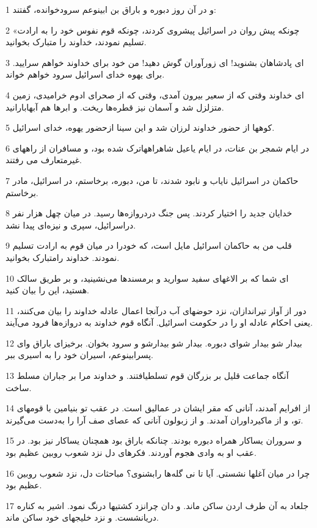 \par 1 و در آن روز دبوره و باراق بن ابینوعم سرودخوانده، گفتند:
\par 2 «چونکه پیش روان در اسرائیل پیشروی کردند، چونکه قوم نفوس خود را به ارادت تسلیم نمودند، خداوند را متبارک بخوانید.
\par 3 ‌ای پادشاهان بشنوید! ای زورآوران گوش دهید! من خود برای خداوند خواهم سرایید. برای یهوه خدای اسرائیل سرود خواهم خواند.
\par 4 ‌ای خداوند وقتی که از سعیر بیرون آمدی، وقتی که از صحرای ادوم خرامیدی، زمین متزلزل شد و آسمان نیز قطره‌ها ریخت. و ابرها هم آبهابارانید.
\par 5 کوهها از حضور خداوند لرزان شد و این سینا ازحضور یهوه، خدای اسرائیل.
\par 6 در ایام شمجر بن عنات، در ایام یاعیل شاهراههاترک شده بود، و مسافران از راههای غیرمتعارف می رفتند.
\par 7 حاکمان در اسرائیل نایاب و نابود شدند، تا من، دبوره، برخاستم، در اسرائیل، مادر برخاستم.
\par 8 خدایان جدید را اختیار کردند. پس جنگ دردروازه‌ها رسید. در میان چهل هزار نفر دراسرائیل، سپری و نیزه‌ای پیدا نشد.
\par 9 قلب من به حاکمان اسرائیل مایل است، که خودرا در میان قوم به ارادت تسلیم نمودند. خداوند رامتبارک بخوانید.
\par 10 ‌ای شما که بر الاغهای سفید سوارید و برمسندها می‌نشینید، و بر طریق سالک هستید، این را بیان کنید.
\par 11 دور از آواز تیراندازان، نزد حوضهای آب درآنجا اعمال عادله خداوند را بیان می‌کنند، یعنی احکام عادله او را در حکومت اسرائیل. آنگاه قوم خداوند به دروازه‌ها فرود می‌آیند.
\par 12 بیدار شو بیدار شو‌ای دبوره. بیدار شو بیدارشو و سرود بخوان. برخیز‌ای باراق و‌ای پسرابینوعم، اسیران خود را به اسیری ببر.
\par 13 آنگاه جماعت قلیل بر بزرگان قوم تسلطیافتند. و خداوند مرا بر جباران مسلط ساخت.
\par 14 از افرایم آمدند، آنانی که مقر ایشان در عمالیق است. در عقب تو بنیامین با قومهای تو، و از ماکیرداوران آمدند. و از زبولون آنانی که عصای صف آرا را به‌دست می‌گیرند.
\par 15 و سروران یساکار همراه دبوره بودند. چنانکه باراق بود همچنان یساکار نیز بود. در عقب او به وادی هجوم آوردند. فکرهای دل نزد شعوب روبین عظیم بود.
\par 16 چرا در میان آغلها نشستی. آیا تا نی گله‌ها رابشنوی؟ مباحثات دل، نزد شعوب روبین عظیم بود.
\par 17 جلعاد به آن طرف اردن ساکن ماند. و دان چرانزد کشتیها درنگ نمود. اشیر به کناره دریانشست. و نزد خلیجهای خود ساکن ماند.
